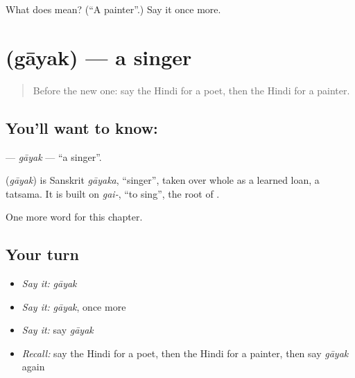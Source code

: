 \begin{tcolorbox}[breakable,colback=teal!4,colframe=teal!35!black,title={Before you move on}]
What does  mean? (\textquotedblleft{}A painter\textquotedblright{}.) Say it once more.
\end{tcolorbox}
\section[\texorpdfstring{\hi{गायक} (gāyak)}{गायक (gāyak)}]{ (gāyak) — a singer}

\label{lesson:HI-C195-gayak}



\begin{quote}
Before the new one: say the Hindi for a poet, then the Hindi for a painter.
\end{quote}

\subsection*{You'll want to know: }
\textbf{} — \emph{gāyak} — \textquotedblleft{}a singer\textquotedblright{}.

\begin{cousinweb}
\textbf{} (\emph{gāyak}) is Sanskrit \emph{gāyaka}, \textquotedblleft{}singer\textquotedblright{}, taken over whole as a learned loan, a tatsama. It is built on \emph{gai-}, \textquotedblleft{}to sing\textquotedblright{}, the root of \textbf{}.
\end{cousinweb}

\begin{grammarlens}[title={What you've built}]
One more word for this chapter.
\end{grammarlens}

\subsection*{Your turn}
\begin{itemize}
\raggedright
  \item \emph{Say it:} \emph{gāyak}
  \item \emph{Say it:} \emph{gāyak}, once more
  \item \emph{Say it:} say \emph{gāyak}
  \item \emph{Recall:} say the Hindi for a poet, then the Hindi for a painter, then say \emph{gāyak} again
\end{itemize}

